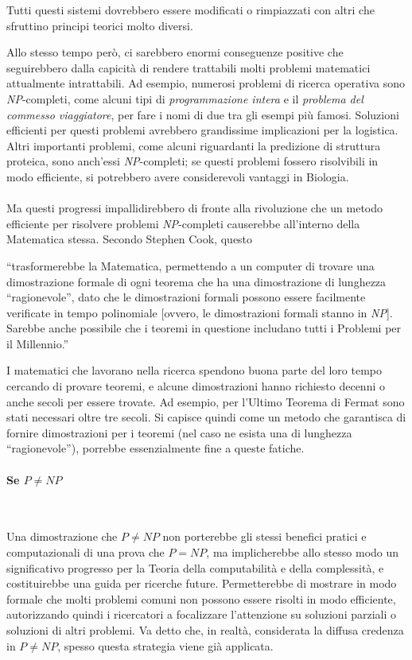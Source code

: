 \documentclass[12pt,a4paper]{report}
\theoremstyle{definition}
\begin{document}
Tutti questi sistemi dovrebbero essere modificati o rimpiazzati con altri che sfruttino principi teorici molto diversi. 

Allo stesso tempo però, ci sarebbero enormi conseguenze positive che seguirebbero dalla capicità di rendere trattabili molti problemi matematici attualmente intrattabili. Ad esempio, numerosi problemi di ricerca operativa sono \emph{NP}-completi, come alcuni tipi di \emph{programmazione intera} e il \emph{problema del commesso viaggiatore}, per fare i nomi di due tra gli esempi più famosi. Soluzioni efficienti per questi problemi avrebbero grandissime implicazioni per la logistica. Altri importanti problemi, come alcuni riguardanti la predizione di struttura proteica, sono anch'essi \emph{NP}-completi; se questi problemi fossero risolvibili in modo efficiente, si potrebbero avere considerevoli vantaggi in Biologia.\\
\\
Ma questi progressi impallidirebbero di fronte alla rivoluzione che un metodo efficiente per risolvere problemi \emph{NP}-completi causerebbe all'interno della Matematica stessa. Secondo Stephen Cook, questo

``trasformerebbe la Matematica, permettendo a un computer di trovare una dimostrazione formale di ogni teorema che ha una dimostrazione di lunghezza ``ragionevole'', dato che le dimostrazioni formali possono essere facilmente verificate in tempo polinomiale [ovvero, le dimostrazioni formali stanno in \emph{NP}]. Sarebbe anche possibile che i teoremi in questione includano tutti i Problemi per il Millennio.''\cite{Cook:tesi}

I matematici che lavorano nella ricerca spendono buona parte del loro tempo cercando di provare teoremi, e alcune dimostrazioni hanno richiesto decenni o anche secoli per essere trovate. Ad esempio, per l'Ultimo Teorema di Fermat sono stati necessari oltre tre secoli. Si capisce quindi come un metodo che garantisca di fornire dimostrazioni per i teoremi (nel caso ne esista una di lunghezza ``ragionevole''), porrebbe essenzialmente fine a queste fatiche.


\paragraph{Se $P \neq NP$}\

Una dimostrazione che $P \neq NP$ non porterebbe gli stessi benefici pratici e computazionali di una prova che $P=NP$, ma implicherebbe allo stesso modo un significativo progresso per la Teoria della computabilità e della complessità, e costituirebbe una guida per ricerche future. Permetterebbe di mostrare in modo formale che molti problemi comuni non possono essere risolti in modo efficiente, autorizzando quindi i ricercatori a focalizzare l'attenzione su soluzioni parziali o soluzioni di altri problemi. Va detto che, in realtà, considerata la diffusa credenza in $P \neq NP$, spesso questa strategia viene già applicata.
\end{document}
